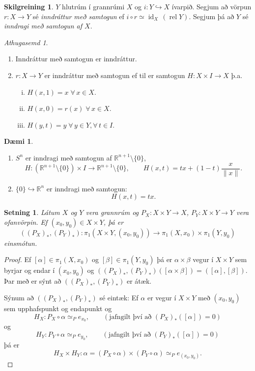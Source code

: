 \documentclass[a4paper,icelandic]{book}
\theoremstyle{definition}
\newtheorem{skilgr}{Skilgreining}[section]
\newtheorem{daemi}{Dæmi}[section]
\theoremstyle{plain}
\newtheorem{setn}{Setning}[section]
\theoremstyle{remark}
\newtheorem*{ath}{Athugasemd}
\newcommand{\R}{\mathbb{R}} %
\DeclareMathOperator{\id}{id} %
\DeclareMathOperator{\rel}{rel}
\newcommand{\prel}[1]{\,\left(\rel #1\right)}
\begin{document}
\begin{skilgr}
  $Y$ hlutrúm í grannrúmi $X$ og $i:Y\hookrightarrow X$ ívarpið. Segjum
  að vörpun $r:X\to Y$ sé \emph{inndráttur með
  samtogun} ef $i\circ r\simeq\id_X\prel
  Y$. Segjum þá að $Y$ sé \emph{inndragi með samtogun af
  $X$}.
\end{skilgr}
\begin{ath}
  \begin{enumerate}[(1)]
    \item Inndráttur með samtogun er inndráttur.
    \item $r:X\to Y$ er inndráttur með samtogun ef til er samtogun
      $H:X\times I\to X$ þ.a. 
      \begin{enumerate}[(i)]
        \item $H(x,1) = x\;\forall\,x\in X$.
        \item $H(x,0) = r(x) \;\forall\,x\in X$.
        \item $H(y,t) = y \;\forall\,y\in Y,\forall\,t\in I$. 
      \end{enumerate}
  \end{enumerate}
\end{ath}
\begin{daemi}
  \begin{enumerate}[(1)]
    \item $S^n$ er inndragi með samtogun af $\R^{n+1}\setminus\{0\}$, \[
      H:(\R^{n+1}\setminus\{0\})\times I\to\R^{n+1}\setminus\{0\}, 
      \qquad
      H(x,t) = tx + (1-t)\frac{x}{\|x\|}. \]
    \item $\{0\}\hookrightarrow\R^n$ er inndragi með samtogun: 
      \[
      H(x,t) = tx.
      \]
  \end{enumerate}
\end{daemi}
\begin{setn}
  Látum $X$ og $Y$ vera grannrúm og $P_X:X\times Y\to X$, $P_Y:X\times
  Y\to Y$ vera ofanvörpin. Ef $(x_0,y_0)\in X\times Y$, þá er \[
  \left((P_X)_*,(P_Y)_*\right):
  \pi_1(X\times Y, (x_0,y_0))
  \to
  \pi_1(X,x_0)\times \pi_1(Y,y_0)
  \]
  einsmótun.
\end{setn}
\begin{proof}
  Ef $[\alpha]\in\pi_1(X,x_0)$ og $[\beta]\in\pi_1(Y,y_0)$ þá er
  $\alpha\times\beta$ vegur í $X\times Y$ sem byrjar og endar í
  $(x_0,y_0)$ og $\left( (P_X)_*,(P_Y)_*
  \right)([\alpha\times\beta])=([\alpha],[\beta])$. Þar með er sýnt að
  $\left( (P_X)_*,(P_Y)_* \right)$ er átæk. 
  
  Sýnum að $( (P_X)_*,(P_Y)_*)$ sé eintæk: Ef $\alpha$ er vegur í
  $X\times Y$ með $(x_0,y_0)$ sem upphafspunkt og endapunkt og 
  \[
  H_X: P_X\circ\alpha\simeq_P e_{x_0},
  \qquad(
  \text{jafngilt því að }
  (P_X)_*([\alpha])=0
  )
  \]
  og
  \[
  H_Y: P_Y\circ\alpha\simeq_P e_{y_0},
  \qquad(
  \text{jafngilt því að }
  (P_Y)_*([\alpha])=0
  )
  \]
  þá er 
  \[
  H_X\times H_Y : 
  \alpha = (P_X\circ\alpha)\times(P_Y\circ\alpha)
  \simeq_P e_{(x_0,y_0)}.
  \]
\end{proof}
\end{document}
